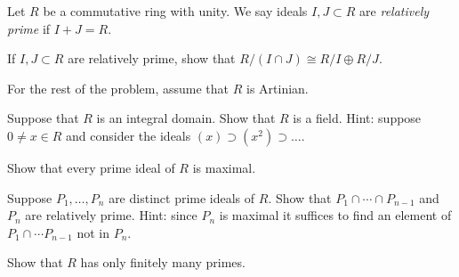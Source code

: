 Let $R$ be a commutative ring with unity. We say ideals $I,J\subset R$
are \emph{relatively prime} if $I+J=R$.
\begin{alist}
\item If $I,J\subset R$ are relatively prime, show that $R/(I\cap
J)\cong R/I\oplus R/J$.
\item For the rest of the problem, assume that $R$ is Artinian.

Suppose that $R$ is an integral domain. Show that $R$ is a
field. Hint: suppose $0\neq x\in R$ and consider the ideals
$(x)\supset(x^2)\supset\ldots $.
\item Show that every prime ideal of $R$ is maximal.
\item Suppose $P_1,\ldots ,P_n$ are distinct prime ideals of $R$. Show
that $P_1\cap \cdots \cap P_{n-1}$ and $P_n$ are relatively prime.
Hint: since $P_n$ is maximal it suffices to find an element of
$P_1\cap \cdots P_{n-1}$ not in $P_n$.
\item Show that $R$ has only finitely many primes.
\end{alist}
